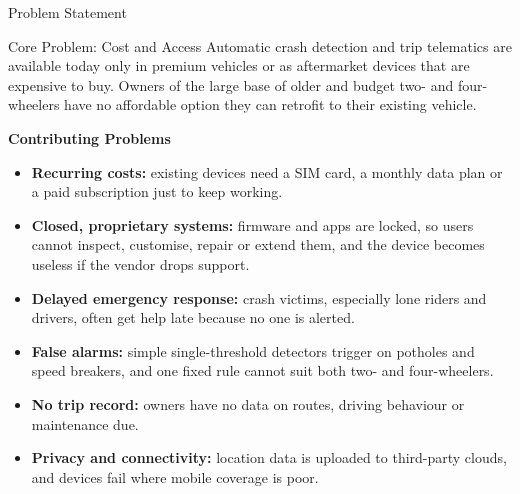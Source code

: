 \documentclass[aspectratio=169,11pt]{beamer}
\begin{document}
\begin{frame}{Problem Statement}
  \small
  \begin{block}{Core Problem: Cost and Access}
    Automatic crash detection and trip telematics are available today only in
    premium vehicles or as aftermarket devices that are expensive to buy. Owners
    of the large base of older and budget two- and four-wheelers have no
    affordable option they can retrofit to their existing vehicle.
  \end{block}

  \vspace{0.3em}
  \textbf{Contributing Problems}
  \begin{itemize}
    \item \textbf{Recurring costs:} existing devices need a SIM card, a monthly
      data plan or a paid subscription just to keep working.
    \item \textbf{Closed, proprietary systems:} firmware and apps are locked, so
      users cannot inspect, customise, repair or extend them, and the device
      becomes useless if the vendor drops support.
    \item \textbf{Delayed emergency response:} crash victims, especially lone
      riders and drivers, often get help late because no one is alerted.
    \item \textbf{False alarms:} simple single-threshold detectors trigger on
      potholes and speed breakers, and one fixed rule cannot suit both
      two- and four-wheelers.
    \item \textbf{No trip record:} owners have no data on routes, driving
      behaviour or maintenance due.
    \item \textbf{Privacy and connectivity:} location data is uploaded to
      third-party clouds, and devices fail where mobile coverage is poor.
  \end{itemize}
\end{frame}
\end{document}
